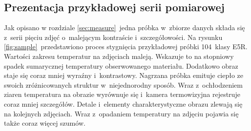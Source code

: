 \subsection{Prezentacja przykładowej serii pomiarowej}
Jak opisano w rozdziale \ref{sec:measure}~jedna próbka w~zbiorze danych składa
się z~serii pięciu zdjęć o~malejącym kontraście i~szczegółowości.
Na rysunku \ref{fig:sample}~przedstawiono proces stygnięcia przykładowej
próbki 104~klasy E5R.
Wartości zakresu temperatur na zdjęciach maleją.
Wskazuje to na stopniowy spadek sumarycznej temperatury obserwowanego materiału.
Dodatkowo obraz staje się coraz mniej wyraźny i~kontrastowy.
Nagrzana próbka emituje ciepło ze swoich zróżnicowanych struktur w~niejednorodny
sposób.
Wraz z~ochłodzeniem ziaren temperatura na obrazie wyrównuje się i~kamera
termowizyjna rejestruje coraz mniej szczegółów.
Detale i~elementy charakterystyczne obrazu zlewają się na kolejnych zdjęciach.
Wraz z~opadaniem temperatury na zdjęciu pojawia się także coraz więcej szumów.
